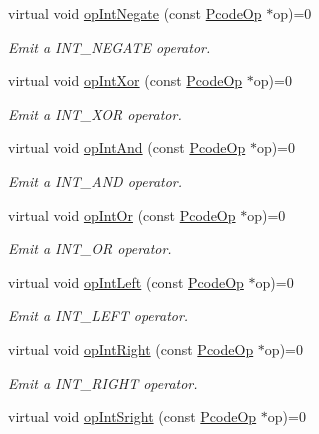 \begin{DoxyCompactItemize}
virtual void \mbox{\hyperlink{class_print_language_a28ef70bb6dafb1f1e21ff51765752db4}{op\+Int\+Negate}} (const \mbox{\hyperlink{class_pcode_op}{Pcode\+Op}} $\ast$op)=0
\begin{DoxyCompactList}\small\item\em Emit a I\+N\+T\+\_\+\+N\+E\+G\+A\+TE operator. \end{DoxyCompactList}\item 
virtual void \mbox{\hyperlink{class_print_language_abbd4458cd060ba8ae3b7f86f6564064a}{op\+Int\+Xor}} (const \mbox{\hyperlink{class_pcode_op}{Pcode\+Op}} $\ast$op)=0
\begin{DoxyCompactList}\small\item\em Emit a I\+N\+T\+\_\+\+X\+OR operator. \end{DoxyCompactList}\item 
virtual void \mbox{\hyperlink{class_print_language_a2bd9013ef031f9dc2ccc17deede33684}{op\+Int\+And}} (const \mbox{\hyperlink{class_pcode_op}{Pcode\+Op}} $\ast$op)=0
\begin{DoxyCompactList}\small\item\em Emit a I\+N\+T\+\_\+\+A\+ND operator. \end{DoxyCompactList}\item 
virtual void \mbox{\hyperlink{class_print_language_a008ba65682d1dd60d653621a43d63328}{op\+Int\+Or}} (const \mbox{\hyperlink{class_pcode_op}{Pcode\+Op}} $\ast$op)=0
\begin{DoxyCompactList}\small\item\em Emit a I\+N\+T\+\_\+\+OR operator. \end{DoxyCompactList}\item 
virtual void \mbox{\hyperlink{class_print_language_a5cf7ee355d760052ba0f132ed58a279f}{op\+Int\+Left}} (const \mbox{\hyperlink{class_pcode_op}{Pcode\+Op}} $\ast$op)=0
\begin{DoxyCompactList}\small\item\em Emit a I\+N\+T\+\_\+\+L\+E\+FT operator. \end{DoxyCompactList}\item 
virtual void \mbox{\hyperlink{class_print_language_a13f99f2f75725675daa0ded3e00c4121}{op\+Int\+Right}} (const \mbox{\hyperlink{class_pcode_op}{Pcode\+Op}} $\ast$op)=0
\begin{DoxyCompactList}\small\item\em Emit a I\+N\+T\+\_\+\+R\+I\+G\+HT operator. \end{DoxyCompactList}\item 
virtual void \mbox{\hyperlink{class_print_language_a0c9ce4f054dcfd8a5d1be8b05076729b}{op\+Int\+Sright}} (const \mbox{\hyperlink{class_pcode_op}{Pcode\+Op}} $\ast$op)=0

\end{DoxyCompactItemize}
